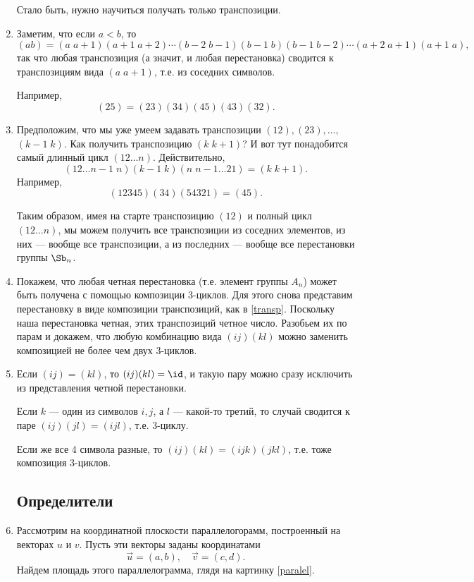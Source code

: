 \begin{enumerate}
Стало быть, нужно научиться получать только транспозиции.
\item Заметим, что если $a<b$, то
$$
(ab)=(a\;a+1)(a+1\;a+2)\cdots(b-2\; b-1)(b-1\;b)(b-1\; b-2)\cdots(a+2\;a+1)(a+1\;a),
$$
так что любая транспозиция (а значит, и любая перестановка) сводится к транспозициям вида $(a\;a+1)$, т.е. из соседних символов.

Например,
$$
(25) = (23)(34)(45)(43)(32).
$$
\item Предположим, что мы уже умеем задавать транспозиции $(12),(23),\dots,$ $(k-1\;k)$. Как получить транспозицию $(k\;k+1)$? И вот тут понадобится самый длинный цикл $(12\dots n)$. Действительно,
$$
(12\dots n-1\; n)(k-1\;k)(n\;n-1\dots 21)=(k\;k+1).
$$
Например,
$$
(12345)(34)(54321)=(45).
$$

Таким образом, имея на старте транспозицию $(12)$ и полный цикл $(12\dots n)$, мы можем получить все транспозиции из соседних элементов, из них --- вообще все транспозиции, а из последних --- вообще все перестановки группы $\Sb_n$.

\item Покажем, что любая четная перестановка (т.е. элемент группы $A_n$) может быть получена с помощью композиции 3-циклов.
Для этого снова представим перестановку в виде композиции транспозиций, как в \eqref{transp}. Поскольку наша перестановка четная, этих транспозиций четное число. Разобьем их по парам и докажем, что любую комбинацию вида $(ij)(kl)$ можно заменить композицией не более чем двух 3-циклов.

\item Если $(ij)=(kl)$, то $(ij)(kl)=\id$, и такую пару можно сразу исключить из представления четной перестановки.

Если $k$ --- один из символов $i,j$, а $l$ --- какой-то третий, то случай сводится к паре $(ij)(jl)=(ijl)$, т.е. 3-циклу.

Если же все 4 символа разные, то $(ij)(kl)=(ijk)(jkl)$, т.е. тоже композиция 3-циклов.


\subsection*{Определители}

\item Рассмотрим на координатной плоскости параллелогорамм, построенный на векторах $u$ и $v$. Пусть эти векторы заданы координатами
$$
\vec u=(a,b),\quad \vec v=(c,d).
$$
Найдем площадь этого параллелограмма, глядя на картинку \ref{paralel}.


\end{enumerate}
